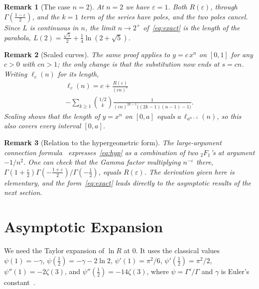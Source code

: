 \documentclass[journal]{IEEEtran}
\newtheorem{remark}{Remark}
\newcommand{\eps}{\varepsilon}
\begin{document}
\begin{remark}[The case $n=2$]\label{rem:n2}
At $n=2$ we have $\eps=1$. Both $R(\eps)$, through $\Gamma(\frac{1-\eps}{2})$, and the $k=1$
term of the series have poles, and the two poles cancel. Since $L$ is continuous in $n$, the
limit $n\to2^+$ of~\eqref{eq:exact} is the length of the parabola,
$L(2)=\frac{\sqrt5}{2}+\frac14\ln(2+\sqrt5)$.
\end{remark}

\begin{remark}[Scaled curves]\label{rem:scaled}
The same proof applies to $y=c\,x^n$ on $[0,1]$ for any $c>0$ with $cn>1$; the only change is
that the substitution now ends at $s=cn$. Writing $\ell_c(n)$ for its length,
\begin{multline}\label{eq:scaled}
  \ell_c(n)=c+\frac{R(\eps)}{(cn)^{\eps}}\\
  -\sum_{k\ge1}\binom{1/2}{k}\frac{1}{(cn)^{2k-1}\bigl((2k-1)(n-1)-1\bigr)}.
\end{multline}
Scaling shows that the length of $y=x^n$ on $[0,a]$ equals $a\,\ell_{a^{n-1}}(n)$, so this also
covers every interval $[0,a]$.
\end{remark}

\begin{remark}[Relation to the hypergeometric form]\label{rem:hyp}
The large-argument connection formula~\cite[Eq.~15.8.2]{DLMF} expresses~\eqref{eq:hyp} as a
combination of two ${}_2F_1$'s at argument $-1/n^2$. One can check that the Gamma factor
multiplying $n^{-\eps}$ there, $\Gamma(1+\frac\eps2)\Gamma(-\frac{1+\eps}{2})/\Gamma(-\frac12)$,
equals $R(\eps)$. The derivation given here is elementary, and the form~\eqref{eq:exact}
leads directly to the asymptotic results of the next section.
\end{remark}

\section{Asymptotic Expansion}\label{sec:asymp}

We need the Taylor expansion of $\ln R$ at $0$. It uses the classical values
$\psi(1)=-\gamma$, $\psi(\frac12)=-\gamma-2\ln2$, $\psi'(1)=\pi^2/6$, $\psi'(\frac12)=\pi^2/2$,
$\psi''(1)=-2\zeta(3)$, and $\psi''(\frac12)=-14\zeta(3)$, where $\psi=\Gamma'/\Gamma$ and
$\gamma$ is Euler's constant~\cite[Secs.~5.4 and~5.15]{DLMF}.
\end{document}
